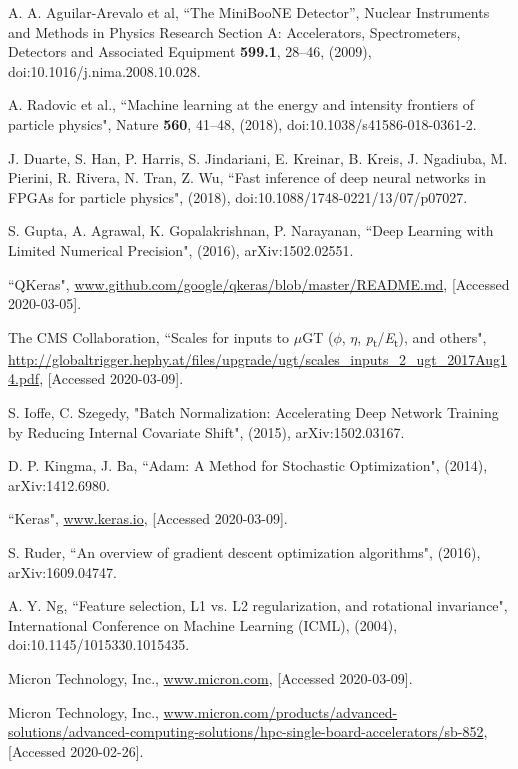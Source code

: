 \documentclass[10pt, paper=a4, UKenglish]{article}
\begin{document}
\begin{thebibliography}{99}
  A. A. Aguilar-Arevalo  et al,
  “The MiniBooNE Detector”,
  Nuclear Instruments and Methods in Physics Research Section A: Accelerators, Spectrometers, Detectors and Associated Equipment {\bf 599.1}, 28–46, (2009),
  doi:10.1016/j.nima.2008.10.028.

  A. Radovic et al.,
  “Machine learning at the energy and intensity frontiers of particle physics",
  Nature {\bf 560}, 41–48, (2018),
  doi:10.1038/s41586-018-0361-2.
  
  J. Duarte, S. Han, P. Harris, S. Jindariani, E. Kreinar, B. Kreis, J. Ngadiuba, M. Pierini, R. Rivera, N. Tran, Z. Wu,
  “Fast inference of deep neural networks in FPGAs for particle physics",
  (2018),
  doi:10.1088/1748-0221/13/07/p07027.
  
  S. Gupta, A. Agrawal, K. Gopalakrishnan, P. Narayanan,
  “Deep Learning with Limited Numerical Precision",
  (2016),
  arXiv:1502.02551.
  
  “QKeras",
  \url{www.github.com/google/qkeras/blob/master/README.md},
  [Accessed 2020-03-05].
  
  The CMS Collaboration,
  “Scales for inputs to $\mu$GT ($\phi$, $\eta$, \textit{p}\textsubscript{t}/\textit{E}\textsubscript{t}), and others",
  \url{http://globaltrigger.hephy.at/files/upgrade/ugt/scales_inputs_2_ugt_2017Aug14.pdf},
  [Accessed 2020-03-09].
  
  S. Ioffe, C. Szegedy,
  "Batch Normalization: Accelerating Deep Network Training by Reducing Internal Covariate Shift",
  (2015),
  arXiv:1502.03167.
  
  D. P. Kingma, J. Ba,
  “Adam: A Method for Stochastic Optimization",
  (2014),
  arXiv:1412.6980.
  
  “Keras",
  \url{www.keras.io},
  [Accessed 2020-03-09].

  S. Ruder,
  “An overview of gradient descent optimization algorithms",
  (2016),
  arXiv:1609.04747.
  
  A. Y. Ng,
  “Feature selection, L1 vs. L2 regularization, and rotational invariance",
  International Conference on Machine Learning (ICML), (2004),
  doi:10.1145/1015330.1015435.
  
  Micron Technology, Inc.,
  \url{www.micron.com},
  [Accessed 2020-03-09].
  
  Micron Technology, Inc.,
  \url{www.micron.com/products/advanced-solutions/advanced-computing-solutions/hpc-single-board-accelerators/sb-852},
  [Accessed 2020-02-26].
  

\end{thebibliography}
\end{document}
